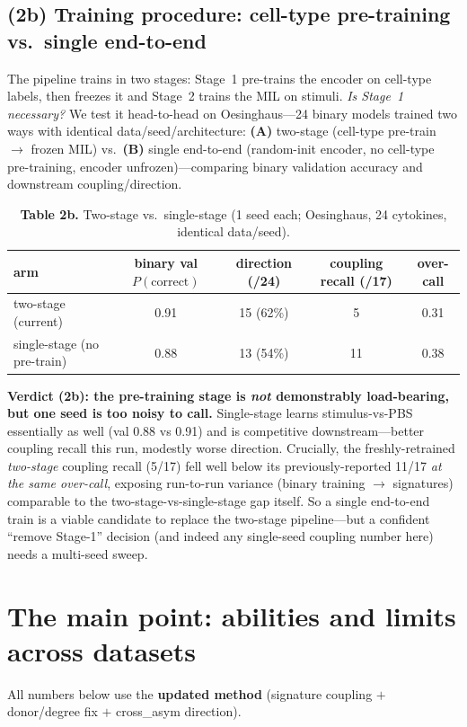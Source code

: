 \documentclass[11pt]{article}
\begin{document}
\subsection*{(2b) Training procedure: cell-type pre-training vs.\ single end-to-end}
The pipeline trains in two stages: Stage~1 pre-trains the encoder on cell-type labels, then freezes it and Stage~2 trains the MIL on stimuli. \emph{Is Stage~1 necessary?} We test it head-to-head on Oesinghaus---24 binary models trained two ways with identical data/seed/architecture: \textbf{(A)} two-stage (cell-type pre-train $\to$ frozen MIL) vs.\ \textbf{(B)} single end-to-end (random-init encoder, no cell-type pre-training, encoder unfrozen)---comparing binary validation accuracy and downstream coupling/direction.

\begin{table}[h]\centering\small
\caption*{\textbf{Table 2b.} Two-stage vs.\ single-stage (1 seed each; Oesinghaus, 24 cytokines, identical data/seed).}
\begin{tabular}{lcccc}
\toprule
arm & binary val $P(\text{correct})$ & direction (/24) & coupling recall (/17) & over-call \\
\midrule
two-stage (current) & 0.91 & 15 (62\%) & 5 & 0.31 \\
single-stage (no pre-train) & 0.88 & 13 (54\%) & 11 & 0.38 \\
\bottomrule
\end{tabular}
\end{table}

\textbf{Verdict (2b): the pre-training stage is \emph{not} demonstrably load-bearing, but one seed is too noisy to call.} Single-stage learns stimulus-vs-PBS essentially as well (val 0.88 vs 0.91) and is competitive downstream---better coupling recall this run, modestly worse direction. Crucially, the freshly-retrained \emph{two-stage} coupling recall (5/17) fell well below its previously-reported 11/17 \emph{at the same over-call}, exposing run-to-run variance (binary training $\to$ signatures) comparable to the two-stage-vs-single-stage gap itself. So a single end-to-end train is a viable candidate to replace the two-stage pipeline---but a confident ``remove Stage-1'' decision (and indeed any single-seed coupling number here) needs a multi-seed sweep.

\section{The main point: abilities and limits across datasets}
All numbers below use the \textbf{updated method} (signature coupling $+$ donor/degree fix $+$ cross\_asym direction).
\end{document}
